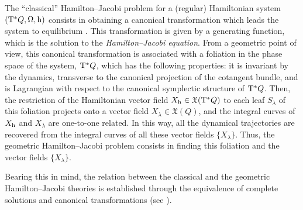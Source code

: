 \documentclass[12pt]{report}
\def\vf{\mathfrak X}
\def\Tan{{\rm T}}
\begin{document}
The ``classical'' Hamilton--Jacobi problem for a (regular) Hamiltonian system
$(\Tan^*Q,\Omega,{\rm h})$ consists in 
obtaining a canonical transformation which leads 
the system to equilibrium \cite{Ar-89,JS-98,LL-76,SC-71}.
This transformation is given by a generating function, which is  
the solution to the {\sl Hamilton--Jacobi equation}.
From a geometric point of view, this canonical transformation
is associated with a foliation in the phase space of the system, $\Tan^*Q$,
which has the following properties:
it is invariant by the dynamics, transverse to the canonical projection of the cotangent bundle,
and is Lagrangian with respect to the
canonical symplectic structure of $\Tan^*Q$.
Then, the restriction of the Hamiltonian vector field $X_{\rm h}\in\vf(\Tan^*Q)$ to
each leaf  $S_\lambda$ of this foliation  projects onto a vector field $X_\lambda\in\vf(Q)$,
and the integral curves of $X_{\rm h}$ and  $X_\lambda$ are one-to-one related.
In this way,  all the dynamical trajectories are recovered from the integral curves
of all these vector fields $\{ X_\lambda\}$.
Thus, the geometric Hamilton--Jacobi problem consists in finding
this foliation and  the vector fields $\{ X_\lambda\}$.

Bearing this in mind, the  relation between the classical and the geometric Hamilton--Jacobi theories
is established through the equivalence of complete solutions 
and canonical transformations (see \cite{RR-2021,Vi-14}).
\end{document}
